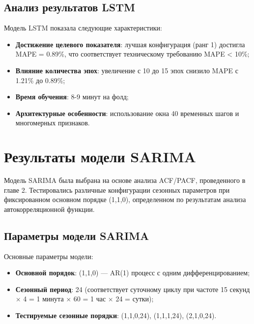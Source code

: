\subsection{Анализ результатов LSTM}

\hspace*{1.25cm}Модель LSTM показала следующие характеристики:

\begin{itemize}
	\item \textbf{Достижение целевого показателя}: лучшая конфигурация (ранг 1) достигла MAPE = 0.89\%, что соответствует техническому требованию MAPE < 10\%;
	\item \textbf{Влияние количества эпох}: увеличение с 10 до 15 эпох снизило MAPE с 1.21\% до 0.89\%;
	\item \textbf{Время обучения}: 8-9 минут на фолд;
	\item \textbf{Архитектурные особенности}: использование окна 40 временных шагов и многомерных признаков.
\end{itemize}

\section{Результаты модели SARIMA}
\label{sec:sarima_results}

\hspace*{1.25cm}Модель SARIMA была выбрана на основе анализа ACF/PACF, проведенного в главе 2. Тестировались различные конфигурации сезонных параметров при фиксированном основном порядке (1,1,0), определенном по результатам анализа автокорреляционной функции.

\subsection{Параметры модели SARIMA}

\hspace*{1.25cm}Основные параметры модели:
\begin{itemize}
	\item \textbf{Основной порядок}: (1,1,0) --- AR(1) процесс с одним дифференцированием;
	\item \textbf{Сезонный период}: 24 (соответствует суточному циклу при частоте 15 секунд $\times$ 4 = 1 минута $\times$ 60 = 1 час $\times$ 24 = сутки);
	\item \textbf{Тестируемые сезонные порядки}: (1,1,0,24), (1,1,1,24), (2,1,0,24).
\end{itemize}

